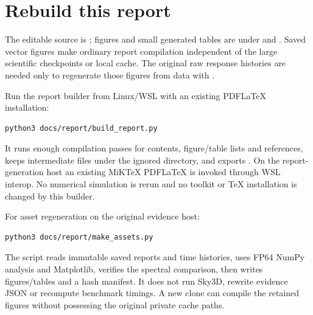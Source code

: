 \documentclass[11pt,a4paper]{article}
\begin{document}
\clearpage
\section{Rebuild this report}
\label{app:report}
The editable source is ;
figures and small generated tables are under 
and . Saved vector figures make ordinary report
compilation independent of the large scientific checkpoints or local cache.
The original raw response histories are needed only to regenerate those
figures from data with .

Run the report builder from Linux/WSL with an existing PDFLaTeX installation:
\begin{lstlisting}
python3 docs/report/build_report.py
\end{lstlisting}
It runs enough compilation passes for contents, figure/table lists and
references, keeps intermediate files under the ignored 
directory, and exports .
On the report-generation host an existing MiKTeX PDFLaTeX is invoked through
WSL interop. No numerical simulation is rerun and no toolkit or TeX
installation is changed by this builder.

For asset regeneration on the original evidence host:
\begin{lstlisting}
python3 docs/report/make_assets.py
\end{lstlisting}
The script reads immutable saved reports and time histories, uses FP64 NumPy
analysis and Matplotlib, verifies the spectral comparison, then writes
figures/tables and a hash manifest. It does not run Sky3D, rewrite evidence
JSON or recompute benchmark timings. A new clone can compile the retained
figures without possessing the original private cache paths.
\end{document}
